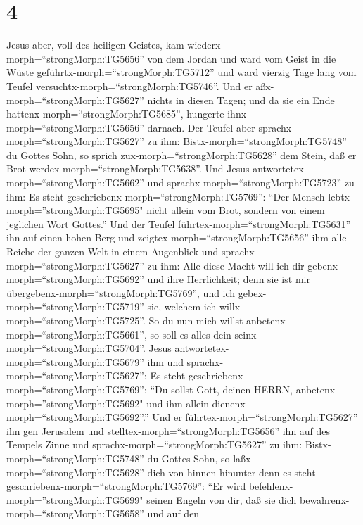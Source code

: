 \hypertarget{section-3}{%
\section{4}\label{section-3}}

 Jesus aber, voll des heiligen Geistes, kam
wiederx-morph=``strongMorph:TG5656'' von dem Jordan und ward vom Geist
in die Wüste geführtx-morph=``strongMorph:TG5712''  und ward
vierzig Tage lang vom Teufel versuchtx-morph=``strongMorph:TG5746''. Und
er aßx-morph=``strongMorph:TG5627'' nichts in diesen Tagen; und da sie
ein Ende hattenx-morph=``strongMorph:TG5685'', hungerte
ihnx-morph=``strongMorph:TG5656'' darnach.  Der Teufel aber
sprachx-morph=``strongMorph:TG5627'' zu ihm:
Bistx-morph=``strongMorph:TG5748'' du Gottes Sohn, so sprich
zux-morph=``strongMorph:TG5628'' dem Stein, daß er Brot
werdex-morph=``strongMorph:TG5638''.  Und Jesus
antwortetex-morph=``strongMorph:TG5662'' und
sprachx-morph=``strongMorph:TG5723'' zu ihm: Es steht
geschriebenx-morph=``strongMorph:TG5769'': ``Der Mensch
lebtx-morph=''strongMorph:TG5695" nicht allein vom Brot, sondern von
einem jeglichen Wort Gottes.''  Und der Teufel
führtex-morph=``strongMorph:TG5631'' ihn auf einen hohen Berg und
zeigtex-morph=``strongMorph:TG5656'' ihm alle Reiche der ganzen Welt in
einem Augenblick  und sprachx-morph=``strongMorph:TG5627''
zu ihm: Alle diese Macht will ich dir
gebenx-morph=``strongMorph:TG5692'' und ihre Herrlichkeit; denn sie ist
mir übergebenx-morph=``strongMorph:TG5769'', und ich
gebex-morph=``strongMorph:TG5719'' sie, welchem ich
willx-morph=``strongMorph:TG5725''.  So du nun mich willst
anbetenx-morph=``strongMorph:TG5661'', so soll es alles dein
seinx-morph=``strongMorph:TG5704''.  Jesus
antwortetex-morph=``strongMorph:TG5679'' ihm und
sprachx-morph=``strongMorph:TG5627'': Es steht
geschriebenx-morph=``strongMorph:TG5769'': ``Du sollst Gott, deinen
HERRN, anbetenx-morph=''strongMorph:TG5692" und ihm allein
dienenx-morph=``strongMorph:TG5692''.''  Und er
führtex-morph=``strongMorph:TG5627'' ihn gen Jerusalem und
stelltex-morph=``strongMorph:TG5656'' ihn auf des Tempels Zinne und
sprachx-morph=``strongMorph:TG5627'' zu ihm:
Bistx-morph=``strongMorph:TG5748'' du Gottes Sohn, so
laßx-morph=``strongMorph:TG5628'' dich von hinnen hinunter 
denn es steht geschriebenx-morph=``strongMorph:TG5769'': ``Er wird
befehlenx-morph=''strongMorph:TG5699" seinen Engeln von dir, daß sie
dich bewahrenx-morph=``strongMorph:TG5658''  und auf den
